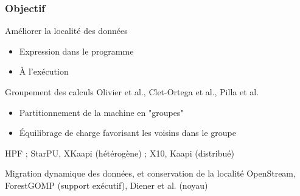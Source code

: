 \documentclass[xcolor={usenames,dvipsnames,svgnames,table}, aspectratio=43]{beamer}
\renewcommand{\emph}[1]{{\usebeamercolor[fg]{titlelike}#1}}
\begin{document}
\begin{frame}[fragile]
\end{frame}



\begin{frame}
  \frametitle{Objectif}
  \begin{exampleblock}{Améliorer la localité des données}
    \begin{itemize}
      \item Expression dans le programme
      \item À l'exécution
    \end{itemize}
  \end{exampleblock}
  \begin{block}{Groupement des calculs}
    Olivier et al., Clet-Ortega et al., Pilla et al.
    \begin{itemize}
      \item Partitionnement de la machine en "groupes"
      \item Équilibrage de charge favorisant les voisins dans le groupe
    \end{itemize}
  \end{block}

  \begin{block}{
  }
    HPF ;  StarPU, XKaapi (hétérogène) ; X10, Kaapi (distribué)
  \end{block}

  \begin{block}{Migration dynamique des données, et conservation de la localité}
    OpenStream, ForestGOMP (support exécutif), Diener et al. (noyau)
  \end{block}

\end{frame}
\end{document}
